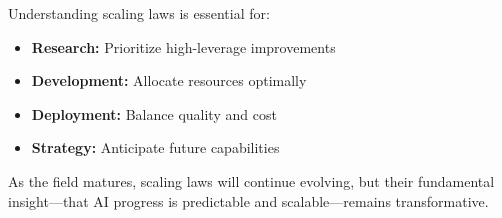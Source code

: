 \documentclass[class=article,crop=false]{standalone}
\begin{document}
Understanding scaling laws is essential for:
\begin{itemize}
  \item \textbf{Research:} Prioritize high-leverage improvements
  \item \textbf{Development:} Allocate resources optimally
  \item \textbf{Deployment:} Balance quality and cost
  \item \textbf{Strategy:} Anticipate future capabilities
\end{itemize}

As the field matures, scaling laws will continue evolving, but their fundamental insight---that AI progress is predictable and scalable---remains transformative.
\end{document}
